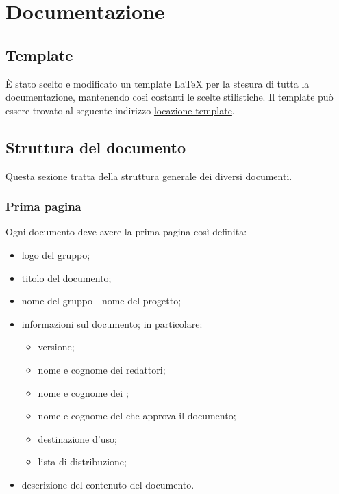 \section{Documentazione}

\subsection{Template}
È stato scelto e modificato un template \LaTeX{} per la stesura di tutta la documentazione, mantenendo così costanti le scelte stilistiche. Il template può essere trovato al seguente indirizzo \url{locazione template}.

\subsection{Struttura del documento}
Questa sezione tratta della struttura generale dei diversi documenti.

\subsubsection{Prima pagina}
Ogni documento deve avere la prima pagina così definita:
\begin{itemize}
\item logo del gruppo;
\item titolo del documento;
\item nome del gruppo - nome del progetto;
\item informazioni sul documento; in particolare:
	\begin{itemize}
		\item versione;
		\item nome e cognome dei redattori;
		\item nome e cognome dei \Verificatori;
		\item nome e cognome del \Responsabile{} che approva il documento;
		\item destinazione d'uso;
		\item lista di distribuzione; 
	\end{itemize}
\item descrizione del contenuto del documento.
\end{itemize}

